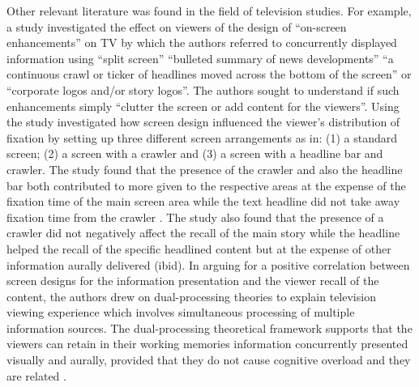 \documentclass[output=paper]{langsci/langscibook}
\begin{document}
Other relevant literature was found in the field of television studies. For example, a study \citep{josephson2006} investigated the effect on viewers of  the design of ``on-screen enhancements'' on TV by which the authors referred to concurrently displayed information using ``split screen'' ``bulleted summary of news developments'' ``a continuous crawl or ticker of headlines moved across the bottom of the screen'' or ``corporate logos and/or story logos''.  The authors sought to understand if such enhancements simply ``clutter the screen or add content for the viewers''. Using  the study investigated how screen design influenced the viewer's distribution of fixation by setting up three different screen arrangements as in: (1) a standard screen; (2) a screen with a crawler and (3) a screen with a headline bar and crawler.  The study found that the presence of the crawler and also the headline bar both contributed to more  given to the respective areas at the expense of the fixation time of the main screen area while the text headline did not take away fixation time from the crawler \citep[161]{josephson2006}. The study also found that the presence of a crawler did not negatively affect the recall of the main story while the headline helped the recall of the specific headlined content but at the expense of other information aurally delivered (ibid). In arguing for a positive correlation between screen designs for the information presentation and the viewer recall of the content, the authors drew on dual-processing theories to explain television viewing experience which involves simultaneous processing of multiple information sources. The dual-processing theoretical framework supports that the viewers can retain in their working memories information concurrently presented visually and aurally, provided that they do not cause cognitive overload and they are related \citep{Mayer1998}. 
\end{document}
